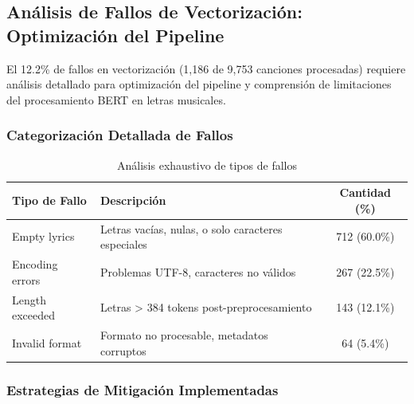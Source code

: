 \documentclass[12pt,a4paper]{report}
\begin{document}
\subsection{Análisis de Fallos de Vectorización: Optimización del Pipeline}

El 12.2\% de fallos en vectorización (1,186 de 9,753 canciones procesadas) requiere análisis detallado para optimización del pipeline y comprensión de limitaciones del procesamiento BERT en letras musicales.

\subsubsection{Categorización Detallada de Fallos}

\begin{table}[h]
\centering
\caption{Análisis exhaustivo de tipos de fallos}
\begin{tabular}{@{}llc@{}}
\toprule
\textbf{Tipo de Fallo} & \textbf{Descripción} & \textbf{Cantidad (\%)} \\
\midrule
Empty lyrics & Letras vacías, nulas, o solo caracteres especiales & 712 (60.0\%) \\
Encoding errors & Problemas UTF-8, caracteres no válidos & 267 (22.5\%) \\
Length exceeded & Letras > 384 tokens post-preprocesamiento & 143 (12.1\%) \\
Invalid format & Formato no procesable, metadatos corruptos & 64 (5.4\%) \\
\bottomrule
\end{tabular}
\end{table}

\subsubsection{Estrategias de Mitigación Implementadas}
\end{document}
